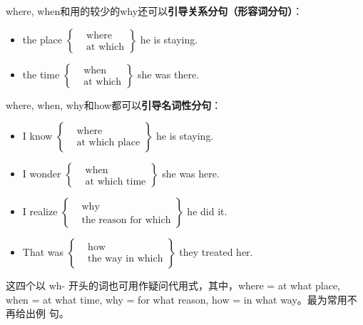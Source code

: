 where, when和用的较少的why还可以\textbf{引导关系分句（形容词分句）}：
\begin{itemize}
\item the place
    $\left\{
      \begin{aligned}
        &\text{where}\\
        &\text{at which}
      \end{aligned}
      \right\} $ he is staying.

\item the time
    $\left\{
      \begin{aligned}
        &\text{when}\\
        &\text{at which}
      \end{aligned}
      \right\} $ she was there.
\end{itemize}

where, when, why和how都可以\textbf{引导名词性分句}：
\begin{itemize}
\item I know
    $\left\{
      \begin{aligned}
        &\text{where}\\
        &\text{at which place}
      \end{aligned}
      \right\} $ he is staying.

\item I wonder
    $\left\{
      \begin{aligned}
        &\text{when}\\
        &\text{at which time}
      \end{aligned}
      \right\} $ she was here.

\item I realize
    $\left\{
      \begin{aligned}
        &\text{why}\\
        &\text{the reason for which}
      \end{aligned}
      \right\} $ he did it.

\item That was
    $\left\{
      \begin{aligned}
        &\text{how}\\
        &\text{the way in which}
      \end{aligned}
      \right\} $ they treated her.
\end{itemize}

这四个以 wh- 开头的词也可用作疑问代用式，其中，where = at what place, when =
at what time, why = for what reason, how = in what way。最为常用不再给出例
句。

